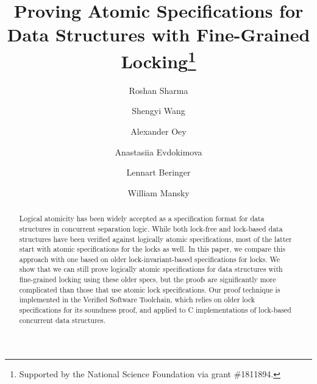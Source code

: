 \documentclass[runningheads]{llncs}
\begin{document}
\title{Proving Atomic Specifications for Data Structures with Fine-Grained Locking\thanks{Supported by the National Science Foundation via grant \#1811894.}}
%
%
\author{Roshan Sharma \and
Shengyi Wang \and
Alexander Oey \and
Anastasiia Evdokimova \and
Lennart Beringer \and
William Mansky} %





\maketitle

\begin{abstract}
Logical atomicity has been widely accepted as a specification format for data structures in concurrent separation logic. While both lock-free and lock-based data structures have been verified against logically atomic specifications, most of the latter start with atomic specifications for the locks as well. In this paper, we compare this approach with one based on older lock-invariant-based specifications for locks. We show that we can still prove logically atomic specifications for data structures with fine-grained locking using these older specs, but the proofs are significantly more complicated than those that use atomic lock specifications. Our proof technique is implemented in the Verified Software Toolchain, which relies on older lock specifications for its soundness proof, and applied to C implementations of lock-based concurrent data structures.

\end{abstract}

\end{document}
